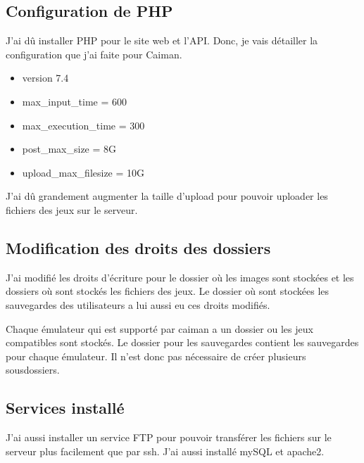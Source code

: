\documentclass[a4paper,12pt,french]{sphinxmanual}
\begin{document}
\subsection{Configuration de PHP}
\label{\detokenize{fonctionnelle:configuration-de-php}}
\sphinxAtStartPar
J’ai dû installer PHP pour le site web et l’API. Donc, je vais détailler la configuration que j’ai faite pour Caiman.
\begin{itemize}
\item {} 
\sphinxAtStartPar
version 7.4

\item {} 
\sphinxAtStartPar
max\_input\_time = 600

\item {} 
\sphinxAtStartPar
max\_execution\_time = 300

\item {} 
\sphinxAtStartPar
post\_max\_size = 8G

\item {} 
\sphinxAtStartPar
upload\_max\_filesize = 10G

\end{itemize}

\sphinxAtStartPar
J’ai dû grandement augmenter la taille d’upload pour pouvoir uploader les fichiers des jeux sur le serveur.


\subsection{Modification des droits des dossiers}
\label{\detokenize{fonctionnelle:modification-des-droits-des-dossiers}}
\sphinxAtStartPar
J’ai modifié les droits d’écriture pour le dossier où les images sont stockées et les dossiers où sont stockés les fichiers des jeux. Le dossier où sont stockées les sauvegardes des utilisateurs a lui aussi eu ces droits modifiés.

\sphinxAtStartPar
Chaque émulateur qui est supporté par caiman a un dossier ou les jeux compatibles sont stockés. Le dossier pour les sauvegardes contient les sauvegardes pour chaque émulateur. Il n’est donc pas nécessaire de créer plusieurs sous\sphinxhyphen{}dossiers.


\subsection{Services installé}
\label{\detokenize{fonctionnelle:services-installe}}
\sphinxAtStartPar
J’ai aussi installer un service FTP pour pouvoir transférer les fichiers sur le serveur plus facilement que par ssh. J’ai aussi installé mySQL et apache2.
\end{document}
